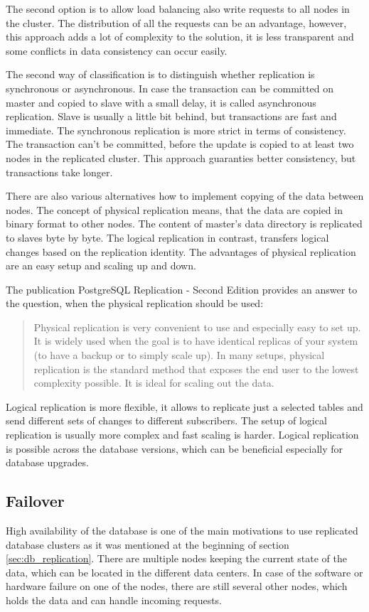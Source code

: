 \documentclass[
  digital, %
  twoside, %
  table,   %
  lof,     %
  lot,     %
]{fithesis3}
\begin{document}
The second option is to allow load balancing also write requests to all nodes in the cluster. The distribution of all the requests can be an advantage, however, this approach adds a lot of complexity to the solution, it is less transparent and some conflicts in data consistency can occur easily.

The second way of classification is to distinguish whether replication is synchronous or asynchronous. In case the transaction can be committed on master and copied to slave with a small delay, it is called asynchronous replication. Slave is usually a little bit behind, but transactions are fast and immediate. The synchronous replication is more strict in terms of consistency. The transaction can't be committed, before the update is copied to at least two nodes in the replicated cluster. This approach guaranties better consistency, but transactions take longer.

There are also various alternatives how to implement copying of the data between nodes. The concept of physical replication means, that the data are copied in binary format to other nodes. The content of master's data directory is replicated to slaves byte by byte. The logical replication in contrast, transfers logical changes based on the replication identity. The advantages of physical replication are an easy setup and scaling up and down.

The publication PostgreSQL Replication - Second Edition provides an answer to the question, when the physical replication should be used:
\begin{quote}
Physical replication is very convenient to use and especially easy to set up. It is
widely used when the goal is to have identical replicas of your system (to have a
backup or to simply scale up).
In many setups, physical replication is the standard method that exposes the end
user to the lowest complexity possible. It is ideal for scaling out the data. \cite[p. 10]{pg}
\end{quote}

Logical replication is more flexible, it allows to replicate just a selected tables and send different sets of changes to different subscribers. The setup of logical replication is usually more complex and fast scaling is harder. Logical replication is possible across the database versions, which can be beneficial especially for database upgrades.

\subsection{Failover} \label{sec:failover}
High availability of the database is one of the main motivations to use replicated database clusters as it was mentioned at the beginning of section \ref{sec:db_replication}. There are multiple nodes keeping the current state of the data, which can be located in the different data centers. In case of the software or hardware failure on one of the nodes, there are still several other nodes, which holds the data and can handle incoming requests.
\end{document}
